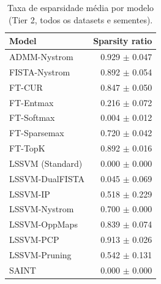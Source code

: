 \begin{table}[ht]
  \centering
  \caption{Taxa de esparsidade média por modelo (Tier 2, todos os datasets e sementes).}
  \label{tab:tier2_sparsity}
  \begin{tabular}{lr}
    \toprule
    Model & Sparsity ratio \\
    \midrule
ADMM-Nystrom & 0.929 $\pm$ 0.047 \\
FISTA-Nystrom & 0.892 $\pm$ 0.054 \\
FT-CUR & 0.847 $\pm$ 0.050 \\
FT-Entmax & 0.216 $\pm$ 0.072 \\
FT-Softmax & 0.004 $\pm$ 0.012 \\
FT-Sparsemax & 0.720 $\pm$ 0.042 \\
FT-TopK & 0.892 $\pm$ 0.016 \\
LSSVM (Standard) & 0.000 $\pm$ 0.000 \\
LSSVM-DualFISTA & 0.045 $\pm$ 0.069 \\
LSSVM-IP & 0.518 $\pm$ 0.229 \\
LSSVM-Nystrom & 0.700 $\pm$ 0.000 \\
LSSVM-OppMaps & 0.839 $\pm$ 0.074 \\
LSSVM-PCP & 0.913 $\pm$ 0.026 \\
LSSVM-Pruning & 0.542 $\pm$ 0.131 \\
SAINT & 0.000 $\pm$ 0.000 \\
    \bottomrule
  \end{tabular}
\end{table}